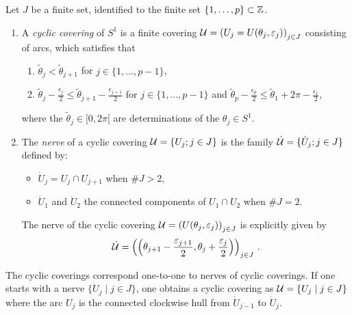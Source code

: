 \begin{defn}
  Let $J$ be a finite set, identified to the finite set
  $\{1,\dots,p\}\subset\mathbb{Z}$.
  \begin{enumerate}
    \item A \emph{cyclic covering} of $S^1$ is a finite covering
      $\mathcal{U}=\left(U_j=U(\theta_j,\varepsilon_j)\right)_{j\in J}$ consisting of
      arcs, which satisfies that
      \begin{enumerate}
        \item $\tilde\theta_j < \tilde\theta_{j+1}$ for $j\in\{1,\dots,p-1\}$,
        \item $\tilde\theta_j-\frac{\epsilon_j}{2}\leq
          \tilde\theta_{j+1}-\frac{\epsilon_{j+1}}{2}$ for
          $j\in\{1,\dots,p-1\}$ and
          $\tilde\theta_p-\frac{\epsilon_p}{2}\leq
          \tilde\theta_{1}+2\pi-\frac{\epsilon_{1}}{2}$,
      \end{enumerate}
      where the $\tilde\theta_j\in [0,2\pi[$ are determinations of the
      $\theta_j\in S^1$.
      \begin{comment}
        \begin{enumerate}
          \item the $\theta_j$ are in ascending order with respect to the
            clockwise orientation of $S^1$;
          \item the $U_j\cap U_{j+1}$ have only one connected component when
            $\#J>2$;
          \item the $U_j$ are not encased by another arc, this means that the
            open sets $U_j\backslash U_l$ are connected for all $j,l\in J$.
        \end{enumerate}
      \end{comment}
    \item The \emph{nerve} of a cyclic covering $\mathcal{U}=\{U_j;j\in J\}$ is the
      family $\dot{\mathcal{U}}=\{\dot U_j;j\in J\}$ defined by:
      \begin{itemize}
        \item $\dot U_j=U_j\cap U_{j+1}$ when $\#J>2$,
        \item $\dot U_1$ and $\dot U_2$ the connected components of
          $U_1\cap U_2$ when $\#J=2$.
      \end{itemize}
      \begin{s-rem}
        The nerve of the cyclic covering
        $\mathcal{U}=\left(U(\theta_j,\varepsilon_j)\right)_{j\in J}$ is explicitly given
        by
        \[
          \dot{\mathcal{U}}=\left(
            \left(\theta_{j+1}-\frac{\varepsilon_{j+1}}{2},
            \theta_{j}+\frac{\varepsilon_{j}}{2}\right)
          \right)_{j\in J} \,.
        \]
      \end{s-rem}
  \end{enumerate}
\end{defn}
The cyclic coverings correspond one-to-one to nerves of cyclic coverings. If
one starts with a nerve $\{\dot U_j \mid j\in J\}$, one obtains a cyclic
covering as $\mathcal{U}=\{U_j \mid j\in J\}$ where the arc $U_j$ is the connected
clockwise hull from $\dot U_{j-1}$ to $\dot U_j$.

